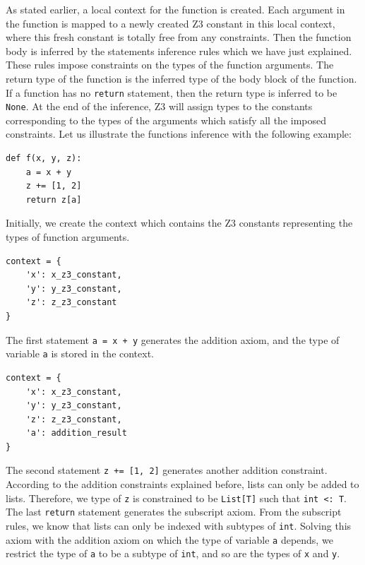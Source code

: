 As stated earlier, a local context for the function is created. Each argument in the function is mapped to a newly created Z3 constant in this local context, where this fresh constant is totally free from any constraints. Then the function body is inferred by the statements inference rules which we have just explained. These rules impose constraints on the types of the function arguments. The return type of the function is the inferred type of the body block of the function. If a function has no \lstinline|return| statement, then the return type is inferred to be \lstinline|None|. At the end of the inference, Z3 will assign types to the constants corresponding to the types of the arguments which satisfy all the imposed constraints. Let us illustrate the functions inference with the following example:

\begin{lstlisting}
def f(x, y, z):
	a = x + y
	z += [1, 2]
	return z[a]	
\end{lstlisting}

Initially, we create the context which contains the Z3 constants representing the types of function arguments.

\begin{lstlisting}
context = {
	'x': x_z3_constant,
	'y': y_z3_constant,
	'z': z_z3_constant
}
\end{lstlisting}

The first statement \lstinline|a = x + y| generates the addition axiom, and the type of variable \lstinline|a| is stored in the context.

\begin{lstlisting}
context = {
	'x': x_z3_constant,
	'y': y_z3_constant,
	'z': z_z3_constant,
	'a': addition_result
}
\end{lstlisting}

The second statement \lstinline|z += [1, 2]| generates another addition constraint. According to the addition constraints explained before, lists can only be added to lists. Therefore, we type of \lstinline|z| is constrained to be \lstinline|List[T]| such that \lstinline|int <: T|. The last \lstinline|return| statement generates the subscript axiom. From the subscript rules, we know that lists can only be indexed with subtypes of \lstinline|int|. Solving this axiom with the addition axiom on which the type of variable \lstinline|a| depends, we restrict the type of \lstinline|a| to be a subtype of \lstinline|int|, and so are the types of \lstinline|x| and \lstinline|y|.

